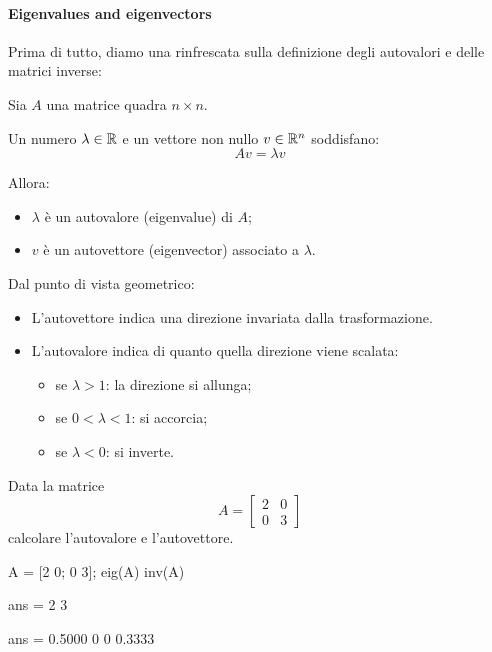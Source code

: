 \paragraph{Eigenvalues and eigenvectors} Prima di tutto, diamo una rinfrescata sulla definizione degli autovalori
e delle matrici inverse:
\begin{definition}
    Sia $ A $ una matrice quadra $ n \times n $.

    Un numero $ \lambda \in \mathbb{R} $ e un vettore non nullo $ v \in \mathbb{R}^n $ soddisfano:
    \[
        Av=\lambda v
    \]

    Allora:
    \begin{itemize}
        \item $ \lambda $ è un autovalore (eigenvalue) di $ A $;
        \item $ v $ è un autovettore (eigenvector) associato a $ \lambda $.
    \end{itemize}
\end{definition}
Dal punto di vista geometrico:
\begin{itemize}
    \item L'autovettore indica una direzione invariata dalla trasformazione.
    \item L'autovalore indica di quanto quella direzione viene scalata:
          \begin{itemize}
              \item se $ \lambda > 1 $: la direzione si allunga;
              \item se $ 0 < \lambda < 1 $: si accorcia;
              \item se $ \lambda < 0 $: si inverte.
          \end{itemize}
\end{itemize}
\begin{example}
    Data la matrice
    \[
        A=
        \begin{bmatrix}
            2 & 0 \\
            0 & 3
        \end{bmatrix}
    \] calcolare l'autovalore e l'autovettore.
\end{example}
\begin{matlab}
    A = [2 0; 0 3];
    eig(A)
    inv(A)
\end{matlab}
\begin{matlabconsole}
    ans =
    2
    3

    ans =
    0.5000         0
    0    0.3333
\end{matlabconsole}

